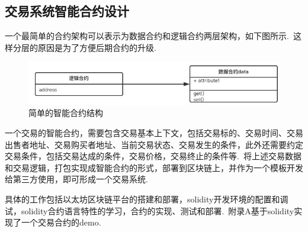 \documentclass[a4paper,12pt,titlepage]{ctexart}
\begin{document}
\subsection{交易系统智能合约设计}
一个最简单的合约架构可以表示为数据合约和逻辑合约两层架构，如下图所示.~这样分层的原因是为了方便后期合约的升级.~\par
\begin{figure}[!hbp]
	\centering
	\includegraphics[scale=0.6]{fig10.jpg}
	\caption{简单的智能合约结构}
\end{figure}
一个交易的智能合约，需要包含交易基本上下文，包括交易标的、交易时间、交易出售者地址、交易购买者地址、当前交易状态、交易发生的条件，此外还需要约定交易条件，包括交易达成的条件，交易价格，交易终止的条件等.~将上述交易数据和交易逻辑，打包实现成智能合约的形式，部署到区块链上，并作为一个模板开发给第三方使用，即可形成一个交易系统.~\par
具体的工作包括以太坊区块链平台的搭建和部署，solidity开发环境的配置和调试，solidity合约语言特性的学习，合约的实现、测试和部署.~附录A基于solidity实现了一个交易合约的demo.~\par
\end{document}
